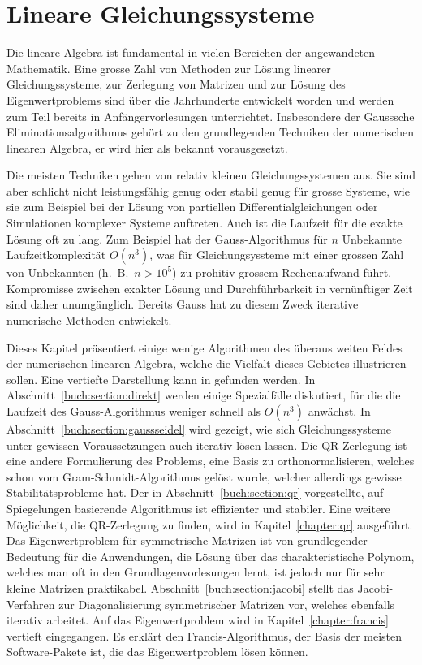 %
%
%
\chapter{Lineare Gleichungssysteme\label{chapter:linsys}}
\rhead{}
Die lineare Algebra ist fundamental in vielen Bereichen der angewandeten
Mathematik.
Eine grosse Zahl von Methoden zur Lösung linearer
Gleichungssysteme, zur Zerlegung von Matrizen und zur Lösung des
Eigenwertproblems sind über die Jahrhunderte entwickelt worden und
werden zum Teil bereits in Anfängervorlesungen unterrichtet.
Insbesondere der Gausssche Eliminationsalgorithmus gehört zu den
grundlegenden Techniken der numerischen linearen Algebra, er wird hier
als bekannt vorausgesetzt.

Die meisten Techniken gehen von relativ kleinen Gleichungssystemen aus.
Sie sind aber schlicht nicht leistungsfähig genug oder stabil genug für 
grosse Systeme, wie sie zum Beispiel bei der Lösung von partiellen
Differentialgleichungen oder Simulationen komplexer Systeme auftreten.
Auch ist die Laufzeit für die exakte Lösung oft zu lang.
Zum Beispiel hat der Gauss-Algorithmus für $n$ Unbekannte Laufzeitkomplexität
$O(n^3)$, was für Gleichungsyssteme mit einer grossen Zahl von Unbekannten
(h.~B.~$n>10^5$) zu prohitiv grossem Rechenaufwand führt.
Kompromisse zwischen exakter Lösung und Durchführbarkeit in vernünftiger
Zeit sind daher unumgänglich.
Bereits Gauss hat zu diesem Zweck iterative numerische Methoden entwickelt.

Dieses Kapitel präsentiert einige wenige Algorithmen des überaus weiten
Feldes der numerischen linearen Algebra, welche die Vielfalt dieses
Gebietes illustrieren sollen.
Eine vertiefte Darstellung kann in \cite{buch:watkins} gefunden werden.
In Abschnitt~\ref{buch:section:direkt} werden einige Spezialfälle
diskutiert, für die die Laufzeit des Gauss-Algorithmus weniger schnell
als $O(n^3)$ anwächst.
In Abschnitt~\ref{buch:section:gaussseidel} wird gezeigt, wie sich
Gleichungssysteme unter gewissen Voraussetzungen auch iterativ lösen
lassen.
Die QR-Zerlegung ist eine andere Formulierung des Problems, eine Basis
zu orthonormalisieren, welches schon vom Gram-Schmidt-Algorithmus gelöst
wurde, welcher allerdings gewisse Stabilitätsprobleme hat.
Der in Abschnitt~\ref{buch:section:qr} vorgestellte, auf Spiegelungen
basierende Algorithmus ist effizienter und stabiler.
Eine weitere Möglichkeit, die QR-Zerlegung zu finden, wird in
Kapitel~\ref{chapter:qr} ausgeführt.
Das Eigenwertproblem für symmetrische Matrizen ist von grundlegender
Bedeutung für die Anwendungen, die Lösung über das charakteristische 
Polynom, welches man oft in den Grundlagenvorlesungen lernt, ist jedoch
nur für sehr kleine Matrizen praktikabel.
Abschnitt~\ref{buch:section:jacobi} stellt das Jacobi-Verfahren zur
Diagonalisierung symmetrischer Matrizen vor, welches ebenfalls iterativ
arbeitet.
Auf das Eigenwertproblem wird in Kapitel~\ref{chapter:francis} 
vertieft eingegangen. 
Es erklärt den Francis-Algorithmus, der Basis der meisten Software-Pakete
ist, die das Eigenwertproblem lösen können.

